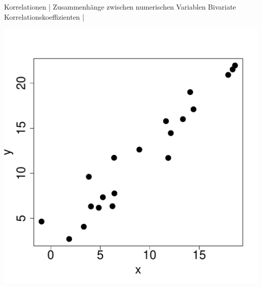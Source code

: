 \begin{frame}
  {Korrelationen | Zusammenhänge zwischen numerischen Variablen}
  Bivariate Korrelationskoeffizienten | \\
  \begin{center}
    \includegraphics[height=0.7\textheight]{graphics/corrplot}
  \end{center}
\end{frame}


